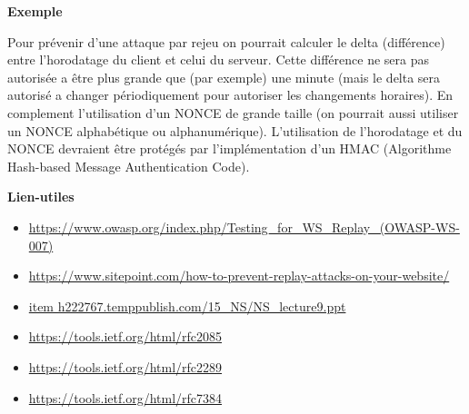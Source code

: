 \bigskip

\begin{flushleft}
\textbf{Exemple}
\end{flushleft}

\smallskip

\begin{flushleft}
Pour prévenir d'une attaque par rejeu on pourrait calculer le delta (différence) entre l'horodatage du client et celui du serveur. Cette différence ne sera pas autorisée a être plus grande que (par exemple) une minute (mais le delta sera autorisé a changer périodiquement pour autoriser les changements horaires). En complement l'utilisation d'un NONCE de grande taille (on pourrait aussi utiliser un NONCE alphabétique ou alphanumérique). L'utilisation de l'horodatage et du NONCE devraient être protégés par l'implémentation d'un  HMAC (Algorithme Hash-based Message  Authentication Code).
\end{flushleft}

\bigskip

\begin{flushleft}
\textbf{Lien-utiles}
\end{flushleft}

\begin{itemize}
\item \url{https://www.owasp.org/index.php/Testing_for_WS_Replay_(OWASP-WS-007)}
\item \url{https://www.sitepoint.com/how-to-prevent-replay-attacks-on-your-website/}
\item \url{item h222767.temppublish.com/15_NS/NS_lecture9.ppt}
\item \url{https://tools.ietf.org/html/rfc2085}
\item \url{https://tools.ietf.org/html/rfc2289}
\item \url{https://tools.ietf.org/html/rfc7384}
\end{itemize}

\endinput
